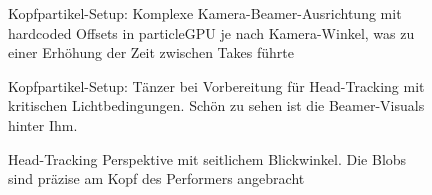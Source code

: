 \FloatBarrier
\begin{figure}[htbp]
    \centering
    \caption{Kopfpartikel-Setup: Komplexe Kamera-Beamer-Ausrichtung mit hardcoded Offsets in particleGPU je nach Kamera-Winkel, was zu einer Erhöhung der Zeit zwischen Takes führte}
    \label{fig:head_setup}
\end{figure}

\begin{figure}[htbp]
    \centering
    \caption{Kopfpartikel-Setup: Tänzer bei Vorbereitung für Head-Tracking mit kritischen Lichtbedingungen. Schön zu sehen ist die Beamer-Visuals hinter Ihm.}
    \label{fig:dancer_head_tracking}
\end{figure}

\begin{figure}[htbp]
    \centering
    \caption{Head-Tracking Perspektive mit seitlichem Blickwinkel. Die Blobs sind präzise am Kopf des Performers angebracht}
    \label{fig:low_light_tracking}
\end{figure}

